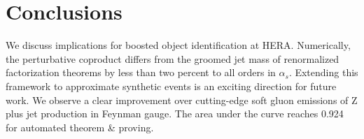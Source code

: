 \section{Conclusions}\label{sec:conclusions}

We discuss implications for boosted object identification at HERA.
Numerically, the perturbative coproduct differs from the groomed jet
mass of renormalized factorization theorems by less than two percent to
all orders in $\alpha_s$. Extending this framework to approximate
synthetic events is an exciting direction for future work. We observe a
clear improvement over cutting-edge soft gluon emissions of Z plus jet
production in Feynman gauge. The area under the curve reaches 0.924 for
automated theorem & proving.

